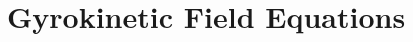 \newpage
\chapter{Gyrokinetic Field Equations}
\label{chap:fields}

\thispagestyle{empty}
\newpage

